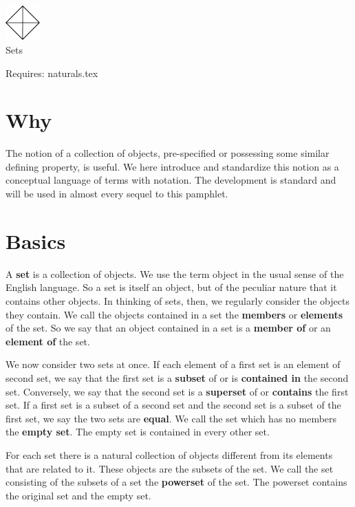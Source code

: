 \documentclass[18pt]{article}
\newcommand{\definition}[1]{\textbf{#1}}
\begin{document}
\begin{center}
  \includegraphics[width=0.1\textwidth]{standin}
  \\
  \vspace{0.5cm}
  {\selectfont \LARGE Sets }
\end{center}

Requires: naturals.tex

\section{Why}

The notion of a collection of objects, pre-specified or possessing some similar defining property, is useful.
We here introduce and standardize this notion as a conceptual language of terms with notation.
The development is standard and will be used in almost every sequel to this pamphlet.

\section{Basics}

A \definition{set} is a collection of objects.
We use the term object in the usual sense of the English language.
So a set is itself an object, but of the peculiar nature that it contains other objects.
In thinking of sets, then, we regularly consider the objects they contain.
We call the objects contained in a set the \definition{members} or \definition{elements} of the set.
So we say that an object contained in a set is a \definition{member of} or an \definition{element of} the set.

We now consider two sets at once.
If each element of a first set is an element of second set, we say that the first set is a \definition{subset} of or is \definition{contained in} the second set.
Conversely, we say that the second set is a \definition{superset} of or \definition{contains} the first set.
If a first set is a subset of a second set and the second set is a subset of the first set, we say the two sets are \definition{equal}.
We call the set which has no members the \definition{empty set}.
The empty set is contained in every other set.

For each set there is a natural collection of objects different from its elements that are related to it.
These objects are the subsets of the set.
We call the set consisting of the subsets of a set the \definition{powerset} of the set.
The powerset contains the original set and the empty set.
\end{document}
